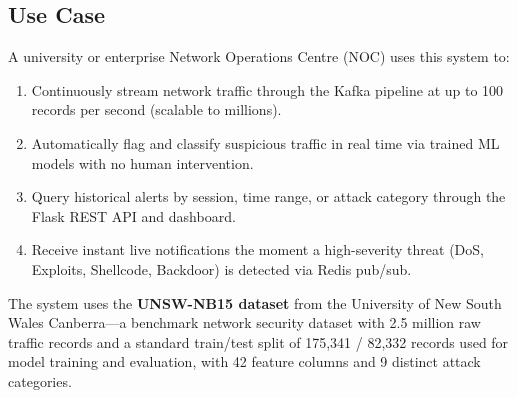 \documentclass[12pt,a4paper]{report}
\begin{document}
\subsection{Use Case}
A university or enterprise Network Operations Centre (NOC) uses this system to:
\begin{enumerate}
  \item Continuously stream network traffic through the Kafka pipeline at up
        to 100 records per second (scalable to millions).
  \item Automatically flag and classify suspicious traffic in real time via
        trained ML models with no human intervention.
  \item Query historical alerts by session, time range, or attack category
        through the Flask REST API and dashboard.
  \item Receive instant live notifications the moment a high-severity threat
    (DoS, Exploits, Shellcode, Backdoor) is detected via Redis pub/sub.
\end{enumerate}

The system uses the \textbf{UNSW-NB15 dataset} from the University of New South
  Wales Canberra---a benchmark network security dataset with 2.5 million raw
  traffic records and a standard train/test split of 175,341 / 82,332 records
  used for model training and evaluation, with 42 feature columns and 9
  distinct attack categories.
\end{document}
